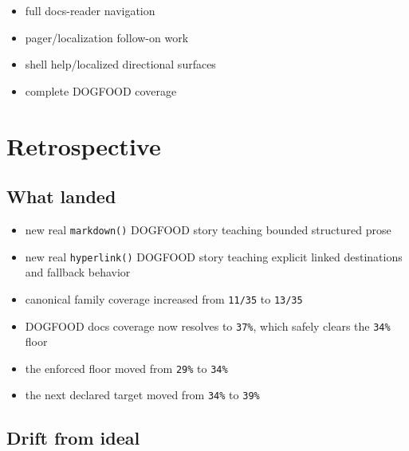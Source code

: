 \begin{itemize}
\tightlist
\item
  full docs-reader navigation
\item
  pager/localization follow-on work
\item
  shell help/localized directional surfaces
\item
  complete DOGFOOD coverage
\end{itemize}

\section{Retrospective}\label{record-070-retrospective}

\subsection{What landed}\label{record-070-what-landed}

\begin{itemize}
\tightlist
\item
  new real \texttt{m\allowbreak{}a\allowbreak{}r\allowbreak{}k\allowbreak{}d\allowbreak{}o\allowbreak{}w\allowbreak{}n\allowbreak{}(\allowbreak{})} DOGFOOD story teaching bounded structured prose
\item
  new real \texttt{h\allowbreak{}y\allowbreak{}p\allowbreak{}e\allowbreak{}r\allowbreak{}l\allowbreak{}i\allowbreak{}n\allowbreak{}k\allowbreak{}(\allowbreak{})} DOGFOOD story teaching explicit linked destinations and fallback behavior
\item
  canonical family coverage increased from \texttt{1\allowbreak{}1\allowbreak{}/\allowbreak{}3\allowbreak{}5} to \texttt{1\allowbreak{}3\allowbreak{}/\allowbreak{}3\allowbreak{}5}
\item
  DOGFOOD docs coverage now resolves to \texttt{3\allowbreak{}7\allowbreak{}\%}, which safely clears the \texttt{3\allowbreak{}4\allowbreak{}\%} floor
\item
  the enforced floor moved from \texttt{2\allowbreak{}9\allowbreak{}\%} to \texttt{3\allowbreak{}4\allowbreak{}\%}
\item
  the next declared target moved from \texttt{3\allowbreak{}4\allowbreak{}\%} to \texttt{3\allowbreak{}9\allowbreak{}\%}
\end{itemize}

\subsection{Drift from ideal}\label{record-070-drift-from-ideal}

